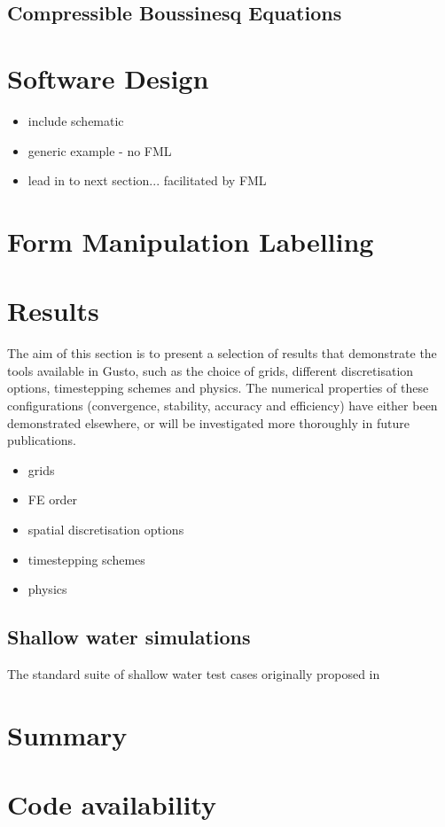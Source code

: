 \documentclass[11pt, a4paper]{article}
\begin{document}
\subsection{Compressible Boussinesq Equations}

\section{Software Design}
\label{sec: design}

\begin{itemize}
\item include schematic
\item generic example - no FML
\item lead in to next section... facilitated by FML
\end{itemize}

\section{Form Manipulation Labelling}
\label{sec: FML}

\section{Results}
\label{sec: results}

The aim of this section is to present a selection of results that
demonstrate the tools available in Gusto, such as the choice of grids,
different discretisation options, timestepping schemes and
physics. The numerical properties of these configurations
(convergence, stability, accuracy and efficiency) have either been
demonstrated elsewhere, or will be investigated more thoroughly in
future publications.

\begin{itemize}
\item grids
\item FE order
\item spatial discretisation options
\item timestepping schemes
\item physics
\end{itemize}

\subsection{Shallow water simulations}
The standard suite of shallow water test cases originally proposed in
\citet{williamson1992standard}



\section{Summary}
\label{sec: summary}

\section{Code availability}


\end{document}
